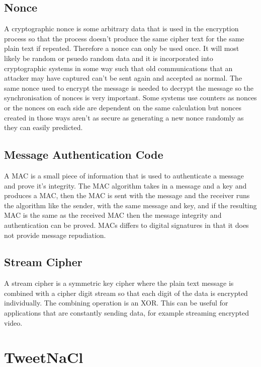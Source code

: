 \subsection{Nonce}

A cryptographic nonce is some arbitrary data that is used in the encryption process so that the process doesn't produce the same cipher text for the same plain text if repeated. Therefore a nonce can only be used once. It will most likely be random or psuedo random data and it is incorporated into cryptographic systems in some way such that old communications that an attacker may have captured can't be sent again and accepted as normal. The same nonce used to encrypt the message is needed to decrypt the message so the synchronisation of nonces is very important. Some systems use counters as nonces or the nonces on each side are dependent on the same calculation but nonces created in those ways aren't as secure as generating a new nonce randomly as they can easily predicted. 

\subsection{Message Authentication Code}

A MAC is a small piece of information that is used to authenticate a message and prove it's integrity. The MAC algorithm takes in a message and a key and produces a MAC, then the MAC is sent with the message and the receiver runs the algorithm like the sender, with the same message and key, and if the resulting MAC is the same as the received MAC then the message integrity and authentication can be proved. MACs differs to digital signatures in that it does not provide message repudiation.

\subsection{Stream Cipher}

A stream cipher is a symmetric key cipher where the plain text message is combined with a cipher digit stream so that each digit of the data is encrypted individually. The combining operation is an XOR. This can be useful for applications that are constantly sending data, for example streaming encrypted video. 

\section{TweetNaCl}

